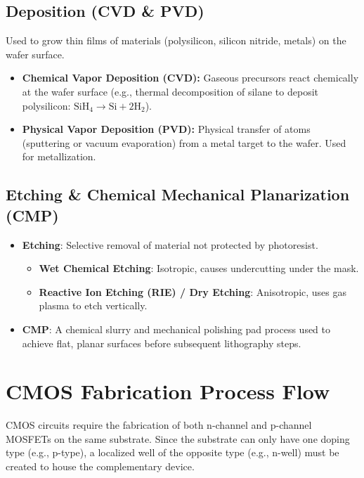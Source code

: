 \documentclass[12pt,a4paper]{article}
\begin{document}
\subsection{Deposition (CVD \& PVD)}
Used to grow thin films of materials (polysilicon, silicon nitride, metals) on the wafer surface.
\begin{itemize}[leftmargin=*, itemsep=3pt]
  \item \textbf{Chemical Vapor Deposition (CVD):} Gaseous precursors react chemically at the wafer surface (e.g., thermal decomposition of silane to deposit polysilicon: $\text{SiH}_4 \to \text{Si} + 2\text{H}_2$).
  \item \textbf{Physical Vapor Deposition (PVD):} Physical transfer of atoms (sputtering or vacuum evaporation) from a metal target to the wafer. Used for metallization.
\end{itemize}

\subsection{Etching \& Chemical Mechanical Planarization (CMP)}
\begin{itemize}[leftmargin=*, itemsep=3.5pt]
  \item \textbf{Etching}: Selective removal of material not protected by photoresist.
  \begin{itemize}[leftmargin=*, noitemsep, topsep=2pt]
    \item \textbf{Wet Chemical Etching}: Isotropic, causes undercutting under the mask.
    \item \textbf{Reactive Ion Etching (RIE) / Dry Etching}: Anisotropic, uses gas plasma to etch vertically.
  \end{itemize}
  \item \textbf{CMP}: A chemical slurry and mechanical polishing pad process used to achieve flat, planar surfaces before subsequent lithography steps.
\end{itemize}

\section{CMOS Fabrication Process Flow}

CMOS circuits require the fabrication of both n-channel and p-channel MOSFETs on the same substrate. Since the substrate can only have one doping type (e.g., p-type), a localized well of the opposite type (e.g., n-well) must be created to house the complementary device.
\end{document}
